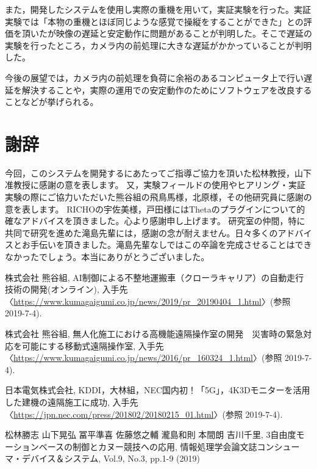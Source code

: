 \documentclass[a4paper,12pt]{jsarticle}
\begin{document}
また，開発したシステムを使用し実際の重機を用いて，実証実験を行った。実証実験では「本物の重機とほぼ同じような感覚で操縦をすることができた」との評価を頂いたが映像の遅延と安定動作に問題があることが判明した。そこで遅延の実験を行ったところ，カメラ内の前処理に大きな遅延がかかっていることが判明した。

今後の展望では，カメラ内の前処理を負荷に余裕のあるコンピュータ上で行い遅延を解決することや，実際の運用での安定動作のためにソフトウェアを改良することなどが挙げられる。
\clearpage

\section*{謝辞} %
今回，このシステムを開発するにあたってご指導ご協力を頂いた松林教授，山下准教授に感謝の意を表します。
又，実験フィールドの使用やヒアリング・実証実験の際にご協力いただいた熊谷組の飛鳥馬様，北原様，その他研究員に感謝の意を表します。
RICHOの宇佐美様，戸田様にはThetaのプラグインについて的確なアドバイスを頂きました。心より感謝申し上げます。
研究室の仲間，特に共同で研究を進めた滝島先輩には，感謝の念が耐えません。日々多くのアドバイスとお手伝いを頂きました。滝島先輩なしではこの卒論を完成させることはできなかったでしょう。本当にありがとうございました。

\clearpage

\begin{flushleft} %
\begin{thebibliography}{9} %

株式会社 熊谷組, AI制御による不整地運搬車（クローラキャリア）の自動走行技術の開発(オンライン), 入手先〈\url{https://www.kumagaigumi.co.jp/news/2019/pr_20190404_1.html}〉(参照 2019-7-4).

株式会社 熊谷組, 無人化施工における高機能遠隔操作室の開発　災害時の緊急対応を可能にする移動式遠隔操作室, 入手先〈\url{https://www.kumagaigumi.co.jp/news/2016/pr_160324_1.html}〉(参照 2019-7-4).

日本電気株式会社, KDDI，大林組，NEC国内初！「5G」，4K3Dモニターを活用した建機の遠隔施工に成功, 入手先〈\url{https://jpn.nec.com/press/201802/20180215_01.html}〉(参照 2019-7-4).

松林勝志 山下晃弘 冨平準喜 佐藤悠之輔 瀧島和則 本間朗 吉川千里, 3自由度モーションベースの制御とカヌー競技への応用, 情報処理学会論文誌コンシューマ・デバイス＆システム, Vol.9, No.3, pp.1-9 (2019)

\end{thebibliography}
\end{flushleft}
\end{document}
